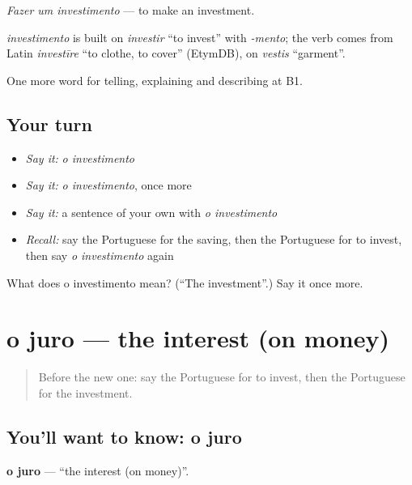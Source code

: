 \emph{Fazer um investimento} — to make an investment.

\begin{cousinweb}
\emph{investimento} is built on \emph{investir} \textquotedblleft{}to invest\textquotedblright{} with \emph{-mento}; the verb comes from Latin \emph{investīre} \textquotedblleft{}to clothe, to cover\textquotedblright{} (EtymDB), on \emph{vestis} \textquotedblleft{}garment\textquotedblright{}.
\end{cousinweb}

\begin{grammarlens}[title={What you've built}]
One more word for telling, explaining and describing at B1.
\end{grammarlens}

\subsection*{Your turn}
\begin{itemize}
\raggedright
  \item \emph{Say it:} \emph{o investimento}
  \item \emph{Say it:} \emph{o investimento}, once more
  \item \emph{Say it:} a sentence of your own with \emph{o investimento}
  \item \emph{Recall:} say the Portuguese for the saving, then the Portuguese for to invest, then say \emph{o investimento} again
\end{itemize}

\begin{tcolorbox}[breakable,colback=teal!4,colframe=teal!35!black,title={Before you move on}]
What does o investimento mean? (\textquotedblleft{}The investment\textquotedblright{}.) Say it once more.
\end{tcolorbox}
\section[o juro]{o juro — the interest (on money)}

\label{lesson:PT-C392-juro}



\begin{quote}
Before the new one: say the Portuguese for to invest, then the Portuguese for the investment.
\end{quote}

\subsection*{You'll want to know: o juro}
\textbf{o juro} — \textquotedblleft{}the interest (on money)\textquotedblright{}.

